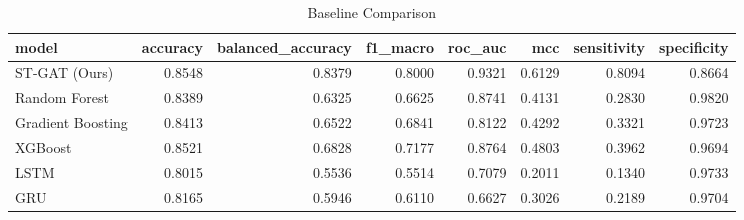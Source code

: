 \begin{table}
\caption{Baseline Comparison}
\label{tab:baselines}
\begin{tabular}{lrrrrrrr}
\toprule
model & accuracy & balanced_accuracy & f1_macro & roc_auc & mcc & sensitivity & specificity \\
\midrule
ST-GAT (Ours) & 0.8548 & 0.8379 & 0.8000 & 0.9321 & 0.6129 & 0.8094 & 0.8664 \\
Random Forest & 0.8389 & 0.6325 & 0.6625 & 0.8741 & 0.4131 & 0.2830 & 0.9820 \\
Gradient Boosting & 0.8413 & 0.6522 & 0.6841 & 0.8122 & 0.4292 & 0.3321 & 0.9723 \\
XGBoost & 0.8521 & 0.6828 & 0.7177 & 0.8764 & 0.4803 & 0.3962 & 0.9694 \\
LSTM & 0.8015 & 0.5536 & 0.5514 & 0.7079 & 0.2011 & 0.1340 & 0.9733 \\
GRU & 0.8165 & 0.5946 & 0.6110 & 0.6627 & 0.3026 & 0.2189 & 0.9704 \\
\bottomrule
\end{tabular}
\end{table}
